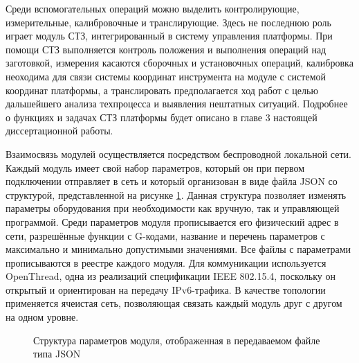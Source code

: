 Среди вспомогательных операций можно выделить контролирующие, измерительные, калибровочные и транслирующие. Здесь не последнюю роль играет модуль СТЗ, интегрированный в систему управления платформы. При помощи СТЗ выполняется контроль положения и выполнения операций над заготовкой, измерения касаются сборочных и установочных операций, калибровка неоходима для связи системы координат инструмента на модуле с системой координат платформы, а транслировать предполагается ход работ с целью дальшейшего анализа техпроцесса и выявления нештатных ситуаций. Подробнее о функциях и задачах СТЗ платформы будет описано в главе 3 настоящей диссертационной работы.

Взаимосвязь модулей осуществляется посредством беспроводной локальной сети. Каждый модуль имеет свой набор параметров, который он при первом подключении отправляет в сеть и который организован в виде файла JSON со структурой, представленной на рисунке \cref{fig:json}. Данная структура позволяет изменять параметры оборудования при необходимости как вручную, так и управляющей программой. Среди параметров модуля прописывается его физический адрес в сети, разрешённые функции с G-кодами, название и перечень параметров с максимально и минимально допустимыми значениями. Все файлы с параметрами прописываются в реестре каждого модуля. Для коммуникации используется OpenThread, одна из реализаций спецификации IEEE 802.15.4, поскольку он открытый и ориентирован на передачу IPv6-трафика. В качестве топологии применяется ячеистая сеть, позволяющая связать каждый модуль друг с другом на одном уровне.

\begin{figure}[ht]
	\caption{Структура параметров модуля, отображенная в передаваемом файле типа JSON}\label{fig:json}
\end{figure}


